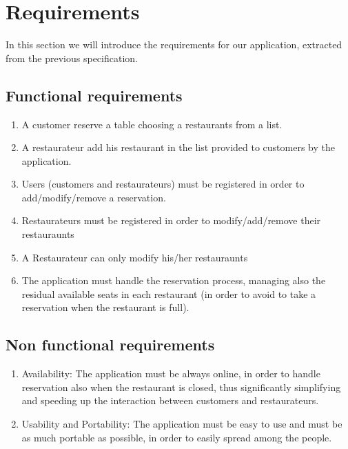 \section{Requirements}
	In this section we will introduce the requirements for our application, extracted from the previous specification.
	
\subsection{Functional requirements}
\begin{enumerate}
	\item A customer reserve a table choosing a restaurants from a list.
	\item A restaurateur add his restaurant in the list provided to customers by the
		application.
	\item Users (customers and restaurateurs) must be registered in order to
		add/modify/remove a reservation.
	\item Restaurateurs must be registered in order to modify/add/remove their restauraunts
	\item A Restaurateur can only modify his/her restauraunts
	\item The application must handle the reservation process, managing also
		the residual available seats in each restaurant (in order to
		avoid to take a reservation when the restaurant is full).
\end{enumerate}

\subsection{Non functional requirements}
\begin{enumerate}
	\item Availability: The application must be always online, in order to
		handle reservation also when the restaurant is closed, thus
		significantly simplifying and speeding up the interaction
		between customers and restaurateurs.
	\item Usability and Portability: The application must be easy to use and
		must be as much portable as possible, in order to easily spread among
		the people. 
\end{enumerate}
